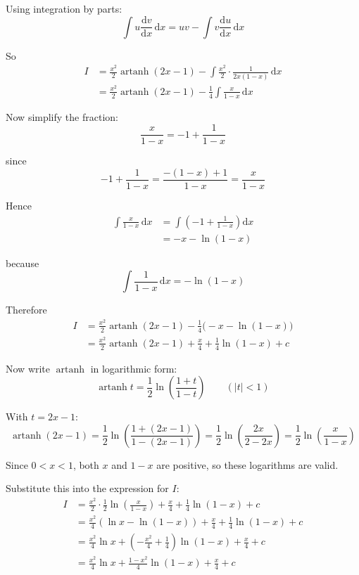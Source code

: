 \documentclass[leqno]{article}
\begin{document}
\begin{enumerate}[
  label=\textbf{\arabic*.},
  leftmargin=*,
  topsep=0pt,
  partopsep=0pt,
  parsep=0pt
]
\begin{djsSolution}
Using integration by parts:
\[
\int u\frac{\mathrm{d}v}{\mathrm{d}x}\,\mathrm{d}x = uv - \int v\frac{\mathrm{d}u}{\mathrm{d}x}\,\mathrm{d}x
\]

So
\begin{align*}
I
&=\frac{x^2}{2}\operatorname{artanh}(2x-1)-\int \frac{x^2}{2}\cdot\frac{1}{2x(1-x)}\,\mathrm{d}x \\
&=\frac{x^2}{2}\operatorname{artanh}(2x-1)-\frac14\int \frac{x}{1-x}\,\mathrm{d}x
\end{align*}

Now simplify the fraction:
\[
\frac{x}{1-x}=-1+\frac{1}{1-x}
\]

since
\[
-1+\frac{1}{1-x}=\frac{-(1-x)+1}{1-x}=\frac{x}{1-x}
\]

Hence
\begin{align*}
\int \frac{x}{1-x}\,\mathrm{d}x
&=\int\left(-1+\frac{1}{1-x}\right)\mathrm{d}x \\
&=-x-\ln(1-x)
\end{align*}

because
\[
\int \frac{1}{1-x}\,\mathrm{d}x=-\ln(1-x)
\]

Therefore
\begin{align*}
I
&=\frac{x^2}{2}\operatorname{artanh}(2x-1)-\frac14\bigl(-x-\ln(1-x)\bigr) \\
&=\frac{x^2}{2}\operatorname{artanh}(2x-1)+\frac{x}{4}+\frac14\ln(1-x)+c
\end{align*}

Now write $\operatorname{artanh}$ in logarithmic form:
\[
\operatorname{artanh} t=\frac12\ln\left(\frac{1+t}{1-t}\right)\qquad (|t|<1)
\]

With $t=2x-1$:
\[
\operatorname{artanh}(2x-1)=\frac12\ln\left(\frac{1+(2x-1)}{1-(2x-1)}\right)
=\frac12\ln\left(\frac{2x}{2-2x}\right)
=\frac12\ln\left(\frac{x}{1-x}\right)
\]

Since $0<x<1$, both $x$ and $1-x$ are positive, so these logarithms are valid.

Substitute this into the expression for $I$:
\begin{align*}
I
&=\frac{x^2}{2}\cdot \frac12\ln\left(\frac{x}{1-x}\right)+\frac{x}{4}+\frac14\ln(1-x)+c \\
&=\frac{x^2}{4}\left(\ln x-\ln(1-x)\right)+\frac{x}{4}+\frac14\ln(1-x)+c \\
&=\frac{x^2}{4}\ln x+\left(-\frac{x^2}{4}+\frac14\right)\ln(1-x)+\frac{x}{4}+c \\
&=\frac{x^2}{4}\ln x+\frac{1-x^2}{4}\ln(1-x)+\frac{x}{4}+c
\end{align*}


\end{djsSolution}
\end{enumerate}
\end{document}
